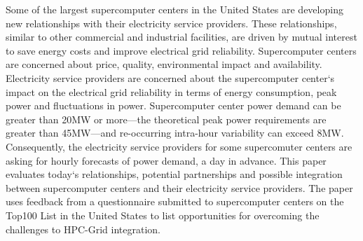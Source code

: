 Some of the largest supercomputer centers in the United States are developing 
new relationships with their electricity service providers. 
These relationships, similar to other commercial and industrial facilities, are 
driven by mutual interest to save energy costs and improve electrical grid reliability.
Supercomputer centers are concerned about price, quality, environmental 
impact and availability.
Electricity service providers are concerned about the supercomputer center`s impact 
on the electrical grid reliability in terms of energy consumption, peak power and fluctuations in power.
Supercomputer center power demand can be greater than 20MW or more---the 
theoretical peak power requirements are greater than 45MW---and re-occurring 
intra-hour variability can exceed 8MW.
Consequently, the electricity service providers for some supercomuter centers
are asking for hourly forecasts of power demand, a day in advance.
This paper evaluates today`s relationships, potential partnerships and possible 
integration between supercomputer centers and their electricity service providers.
The paper uses feedback from a questionnaire submitted to supercomputer centers 
on the Top100 List in the United States to list opportunities for overcoming the 
challenges to HPC-Grid integration.

